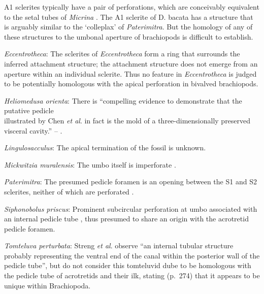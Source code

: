 \documentclass[openany]{book}
\theoremstyle{definition}
\theoremstyle{definition}
\theoremstyle{definition}
\theoremstyle{remark}
\begin{document}
A1 sclerites typically have a pair of perforations, which are
conceivably equivalent to the setal tubes of \emph{Micrina}
\citep{Holmer2011Firstrecord}. The A1 sclerite of D. bacata has a
structure that is arguably similar to the `colleplax' of
\emph{Paterimitra}. But the homology of any of these structures to the
umbonal aperture of brachiopods is difficult to establish.

\hypertarget{Eccentrotheca-coding-49}{}
\emph{Eccentrotheca}: The sclerites of \emph{Eccentrotheca} form a ring
that surrounds the inferred attachment structure; the attachment
structure does not emerge from an aperture within an individual
sclerite. Thus no feature in \emph{Eccentrotheca} is judged to be
potentially homologous with the apical perforation in bivalved
brachiopods.

\hypertarget{Heliomedusa_orienta-coding-49}{}
\emph{Heliomedusa orienta}: There is ``compelling evidence to
demonstrate that the putative pedicle\\
illustrated by Chen \emph{et al}. \citeyearpar[Figs. 4, 6,
7]{Chen2007Reinterpretationof} in fact is the mold of a
three-dimensionally preserved visceral cavity.'' --
\citet{Zhang2009Architectureand}.

\hypertarget{Lingulosacculus-coding-49}{}
\emph{Lingulosacculus}: The apical termination of the fossil is unknown.

\hypertarget{Mickwitzia_muralensis-coding-49}{}
\emph{Mickwitzia muralensis}: The umbo itself is imperforate
\citep{Balthasar2004Shellstructure}.

\hypertarget{Paterimitra-coding-49}{}
\emph{Paterimitra}: The presumed pedicle foramen is an opening between
the S1 and S2 sclerites, neither of which are perforated
\citep{Skovsted2009Thescleritome}.

\hypertarget{Siphonobolus_priscus-coding-49}{}
\emph{Siphonobolus priscus}: Prominent subcircular perforation at umbo
associated with an internal pedicle tube \citep{Popov2009Earlyontogeny},
thus presumed to share an origin with the acrotretid pedicle foramen.

\hypertarget{Tomteluva_perturbata-coding-49}{}
\emph{Tomteluva perturbata}: Streng \emph{et al}.
\citeyearpar{Streng2016Anew} observe ``an internal tubular structure
probably representing the ventral end of the canal within the posterior
wall of the pedicle tube'', but do not consider this tomteluvid dube to
be homologous with the pedicle tube of acrotretids and their ilk,
stating (p.~274) that it appears to be unique within Brachiopoda.
\end{document}
